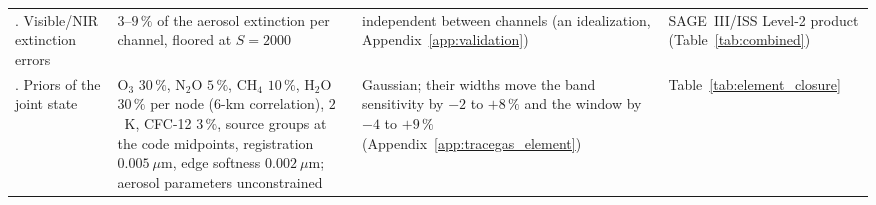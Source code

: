 \begin{table}[t]
\begin{tabular}{>{\raggedright\arraybackslash}p{3.4cm}>{\raggedright\arraybackslash}p{3.0cm}>{\raggedright\arraybackslash}p{5.0cm}>{\raggedright\arraybackslash}p{4.6cm}}
4. Visible/NIR extinction errors & $3$--$9\,\%$ of the aerosol extinction per channel, floored at $S=2000$ & independent between channels (an idealization, Appendix~\ref{app:validation}) & SAGE~III/ISS Level-2 product (Table~\ref{tab:combined}) \\
5. Priors of the joint state & O$_3$ $30\,\%$, N$_2$O $5\,\%$, CH$_4$ $10\,\%$, H$_2$O $30\,\%$ per node ($6$-km correlation), $2$~K, CFC-12 $3\,\%$, source groups at the code midpoints, registration $0.005~\mu$m, edge softness $0.002~\mu$m; aerosol parameters unconstrained & Gaussian; their widths move the band sensitivity by $-2$ to $+8\,\%$ and the window by $-4$ to $+9\,\%$ (Appendix~\ref{app:tracegas_element}) & Table~\ref{tab:element_closure} \\
\bottomrule
\end{tabular}
\end{table}

